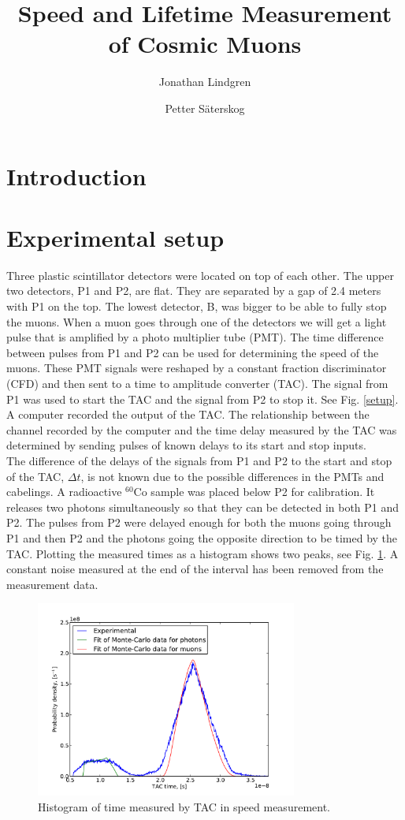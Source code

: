 \documentclass[10pt,twocolumn]{article}
\title{Speed and Lifetime Measurement of Cosmic Muons}
\author{Jonathan Lindgren \and Petter Säterskog}
\begin{document}
\maketitle
\section{Introduction}

\section{Experimental setup}
Three plastic scintillator detectors were located on top of each other. The upper two detectors, P1 and P2, are flat. They are separated by a gap of 2.4 meters with P1 on the top. The lowest detector, B, was bigger to be able to fully stop the muons. When a muon goes through one of the detectors we will get a light pulse that is amplified by a photo multiplier tube (PMT). The time difference between pulses from P1 and P2 can be used for determining the speed of the muons. These PMT signals were reshaped by a constant fraction discriminator (CFD) and then sent to a time to amplitude converter (TAC). The signal from P1 was used to start the TAC and the signal from P2 to stop it. See Fig. \ref{setup}. A computer recorded the output of the TAC. The relationship between the channel recorded by the computer and the time delay measured by the TAC was determined by sending pulses of known delays to its start and stop inputs.\\  %
The difference of the delays of the signals from P1 and P2 to the start and stop of the TAC, $\Delta t$, is not known due to the possible differences in the PMTs and cabelings. A radioactive $^{60}$Co sample was placed below P2 for calibration. It releases two photons simultaneously so that they can be detected in both P1 and P2. The pulses from P2 were delayed enough for both the muons going through P1 and then P2 and the photons going the opposite direction to be timed by the TAC. Plotting the measured times as a histogram shows two peaks, see Fig. \ref{speedHist}. A constant noise measured at the end of the interval has been removed from the measurement data.
\begin{figure}
\centering
\includegraphics[width=8.6cm]{speedFit.pdf}
\caption{Histogram of time measured by TAC in speed measurement.}
\label{speedHist}
\end{figure}
\end{document}
